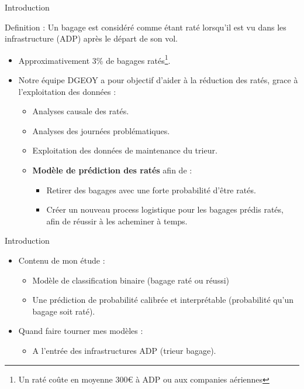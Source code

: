 \documentclass{beamer}
\begin{document}
    
\begin{frame}{Introduction} 

    Definition : Un bagage est considéré comme étant raté lorsqu'il est vu dans les infrastructure (ADP) après le départ de son vol.\break

    
    \begin{itemize}
    \item Approximativement 3\% de bagages ratés\footnote{Un raté coûte en moyenne 300€ à ADP ou aux companies aériennes}.
    \item Notre équipe DGEOY a pour objectif d'aider à la réduction des ratés, grace à l'exploitation des données : 
        \begin{itemize}
            \item Analyses causale des ratés.
            \item Analyses des journées problématiques.
            \item Exploitation des données de maintenance du trieur. \item \textbf{Modèle de prédiction des ratés} afin de : 
                \begin{itemize}
                    \item Retirer des bagages avec une forte probabilité d'être ratés.
                    \item Créer un nouveau process logistique pour les bagages prédis ratés, afin de réussir à les acheminer à temps.
                \end{itemize}
        \end{itemize}

    \end{itemize}
    
\end{frame}

    
\begin{frame}{Introduction} 
    \begin{itemize}
        \item Contenu de mon étude : 
            \begin{itemize}
                \item Modèle de classification binaire (bagage raté ou réussi)
                \item Une prédiction de probabilité calibrée et interprétable (probabilité qu'un bagage soit raté).
            \end{itemize}
        \item Quand faire tourner mes modèles : 
            \begin{itemize}
                \item A l'entrée des infrastructures ADP (trieur bagage).
            \end{itemize}

    \end{itemize}    
\end{frame}
\end{document}
